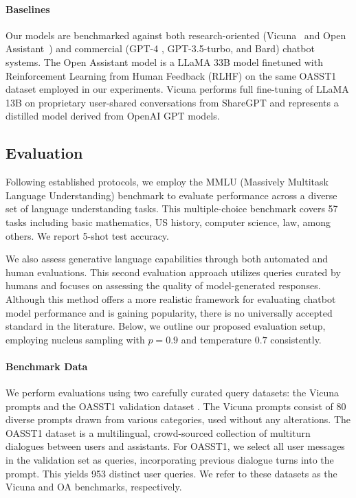 \paragraph{Baselines} Our models are benchmarked against both research-oriented (Vicuna~\citep{vicuna2023} and Open Assistant~\citep{kopf2023openassistant}) and commercial (GPT-4 \citep{openai2023gpt}, GPT-3.5-turbo, and Bard) chatbot systems. The Open Assistant model is a LLaMA 33B model finetuned with Reinforcement Learning from Human Feedback (RLHF) on the same OASST1 dataset employed in our experiments. Vicuna performs full fine-tuning of LLaMA 13B on proprietary user-shared conversations from ShareGPT and represents a distilled model derived from OpenAI GPT models.

\subsection{Evaluation}

Following established protocols, we employ the MMLU (Massively Multitask Language Understanding) benchmark \citep{hendrycksmeasuring} to evaluate performance across a diverse set of language understanding tasks. This multiple-choice benchmark covers 57 tasks including basic mathematics, US history, computer science, law, among others. We report 5-shot test accuracy.

We also assess generative language capabilities through both automated and human evaluations. This second evaluation approach utilizes queries curated by humans and focuses on assessing the quality of model-generated responses. Although this method offers a more realistic framework for evaluating chatbot model performance and is gaining popularity, there is no universally accepted standard in the literature. Below, we outline our proposed evaluation setup, employing nucleus sampling with $p=0.9$ and temperature $0.7$ consistently.

\paragraph{Benchmark Data} We perform evaluations using two carefully curated query datasets: the Vicuna prompts \citep{vicuna2023} and the OASST1 validation dataset \citep{kopf2023openassistant}. The Vicuna prompts consist of 80 diverse prompts drawn from various categories, used without any alterations. The OASST1 dataset is a multilingual, crowd-sourced collection of multiturn dialogues between users and assistants. For OASST1, we select all user messages in the validation set as queries, incorporating previous dialogue turns into the prompt. This yields 953 distinct user queries. We refer to these datasets as the Vicuna and OA benchmarks, respectively.


